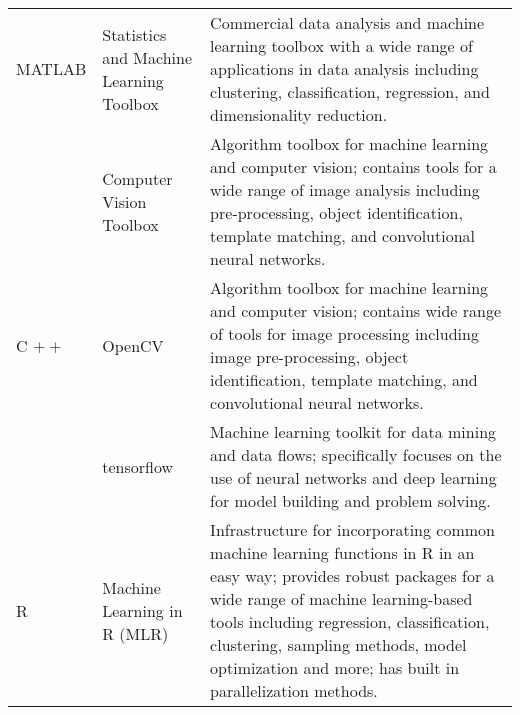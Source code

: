 \begin{landscape}
\begin{center}
\begin{longtable}{p{4cm}p{4cm}p{11cm}}
	   MATLAB & Statistics and Machine Learning Toolbox \cite{matlabml} & Commercial data analysis and machine learning toolbox with a wide range of applications in data analysis including clustering, classification, regression, and dimensionality reduction. \newline \\
	   		&\raggedright Computer Vision Toolbox\cite{matlabcv} & Algorithm toolbox for machine learning and computer vision; contains tools for a wide range of image analysis including pre-processing, object identification, template matching, and convolutional neural networks. \newline \\ 
			
	  C $++$ & OpenCV \cite{opencv} & Algorithm toolbox for machine learning and computer vision; contains wide range of tools for image processing including image pre-processing, object identification, template matching, and convolutional neural networks. \newline \\
	  	& tensorflow \cite{tensorflow} & Machine learning toolkit for data mining and data flows; specifically focuses on the use of neural networks and deep learning for model building and problem solving. \newline \\ 
		
	R & Machine Learning in R (MLR) \cite{mlr} & Infrastructure for incorporating common machine learning functions in R in an easy way; provides robust packages for a wide range of machine learning-based tools including regression, classification, clustering, sampling methods, model optimization and more; has built in parallelization methods. \newline \\  \hline
	
            \bottomrule
        \end{longtable}

    \end{center}
    
\end{landscape}

